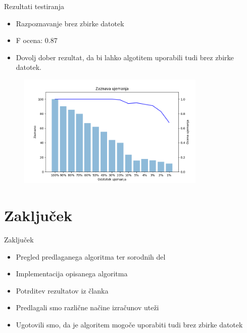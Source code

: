 \documentclass[xcolor=dvipsnames,compress]{beamer}
\begin{document}
\begin{frame}{Rezultati testiranja}
    \begin{itemize}
        \item Razpoznavanje brez zbirke datotek
        \item F ocena: 0.87
        \item Dovolj dober rezultat, da bi lahko algotitem uporabili tudi brez zbirke datotek.
    \end{itemize}
    
    \begin{figure}[ht!]
        \label{fig:subfigures}
        \begin{center}
            \includegraphics[width=0.8\textwidth]{figs/brez_courpusa.png}
        \end{center}
    \end{figure}
    
\end{frame}




\section{Zaključek}
\label{sec:zakljucek}

\begin{frame}{Zaključek}
    \begin{itemize}
        \item Pregled predlaganega algoritma ter sorodnih del
        \item Implementacija opisanega algoritma
        \item Potrditev rezultatov iz članka
        \item Predlagali smo različne načine izračunov uteži
        \item Ugotovili smo, da je algoritem mogoče uporabiti tudi brez zbirke datotek
    \end{itemize}
\end{frame}
\end{document}
